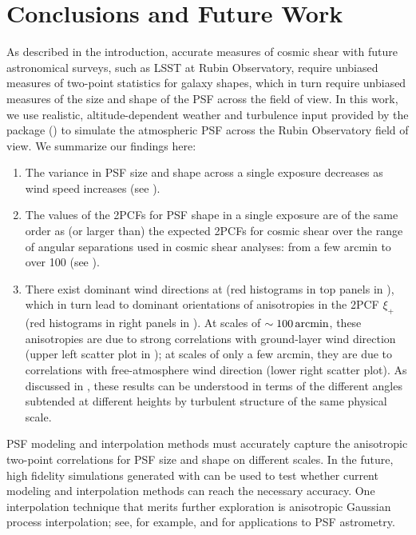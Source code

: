 \documentclass[twocolumn,twocolappendix]{openjournal}
\begin{document}
\section{Conclusions and Future Work} 
As described in the introduction, accurate measures of cosmic shear with future astronomical surveys, such as LSST at Rubin Observatory, require unbiased measures of two-point statistics for galaxy shapes, which in turn require unbiased measures of the size and shape of the PSF across the field of view. 
In this work, we use realistic, altitude-dependent weather and turbulence input provided by the \psfws package () to simulate the atmospheric PSF across the Rubin Observatory field of view. 
We summarize our findings here:
\begin{enumerate}
\item 
The variance in PSF size and shape across a single exposure decreases as wind speed increases (see ).
\item 
The values of the 2PCFs for PSF shape in a single exposure are of the same order as (or larger than) the expected 2PCFs for cosmic shear over the range of angular separations used in cosmic shear analyses: from a few arcmin to over 100\amin 
(see ). 
\item 
There exist dominant wind directions at \cp (red histograms in top panels in ), which in turn lead to dominant orientations of anisotropies in the 2PCF $\xi_+$ (red histograms in right panels in ). 
At scales of $\sim100\mathrm{\,arcmin}$, these anisotropies are due to strong correlations with ground-layer wind direction (upper left  scatter plot in ); at scales of only a few arcmin, they are due to correlations with free-atmosphere wind direction (lower right scatter plot). 
As discussed in , these results can be understood in terms of the different angles subtended at different heights by turbulent structure of the same physical scale. 
\end{enumerate}

PSF modeling and interpolation methods must accurately capture the anisotropic two-point correlations for PSF size and shape on different scales. 
In the future, high fidelity simulations generated with \psfws can be used to test whether current modeling and interpolation methods \citep[e.g., those implemented in][]{jarvis_dark_2020} can reach the necessary accuracy. 
One interpolation technique that merits further exploration is anisotropic Gaussian process interpolation; see, for example, \cite{leget_improving_2021} and \cite{fortino_reducing_2021} for applications to PSF astrometry. 
\end{document}
